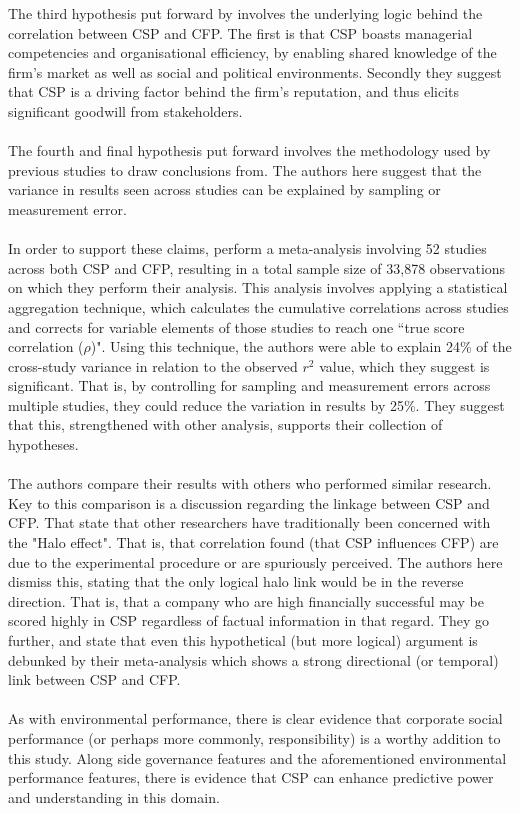 {The third hypothesis put forward by \cite{orlitzky2003corporate} involves the underlying logic behind the correlation between CSP and CFP. The first is that CSP boasts managerial competencies and organisational efficiency, by enabling shared knowledge of the firm's market as well as social and political environments. Secondly they suggest that CSP is a driving factor behind the firm's reputation, and thus elicits significant goodwill from stakeholders. \\\\
The fourth and final hypothesis put forward involves the methodology used by previous studies to draw conclusions from. The authors here suggest that the variance in results seen across studies can be explained by sampling or measurement error. \\\\
In order to support these claims, \cite{orlitzky2003corporate} perform a meta-analysis involving 52 studies across both CSP and CFP, resulting in a total sample size of 33,878 observations on which they perform their analysis. This analysis involves applying a statistical aggregation technique, which calculates the cumulative correlations across studies and corrects for variable elements of those studies to reach one ``true score correlation ($\rho$)". Using this technique, the authors were able to explain 24\% of the cross-study variance in relation to the observed $r^2$ value, which they suggest is significant. That is, by controlling for sampling and measurement errors across multiple studies, they could reduce the variation in results by 25\%. They suggest that this, strengthened with other analysis, supports their collection of hypotheses.\\\\
The authors compare their results with others who performed similar research. Key to this comparison is a discussion regarding the linkage between CSP and CFP. That state that other researchers have traditionally been concerned with the "Halo effect". That is, that correlation found (that CSP influences CFP) are due to the experimental procedure or are spuriously perceived. The authors here dismiss this, stating that the only logical halo link would be in the reverse direction. That is, that a company who are high financially successful may be scored highly in CSP regardless of factual information in that regard. They go further, and state that even this hypothetical (but more logical) argument is debunked by their meta-analysis which shows a strong directional (or temporal) link between CSP and CFP. \\\\
As with environmental performance, there is clear evidence that corporate social performance (or perhaps more commonly, responsibility) is a worthy addition to this study. Along side governance features and the aforementioned environmental performance features, there is evidence that CSP can enhance predictive power and understanding in this domain.}
